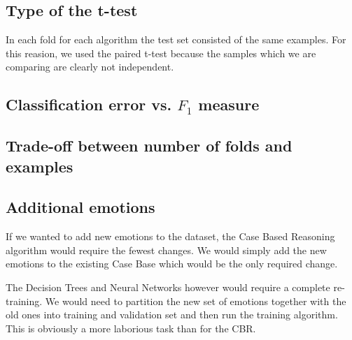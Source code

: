 \documentclass[a4paper]{article}
\begin{document}
\subsection{Type of the t-test}

In each fold for each algorithm the test set consisted of the same examples. For this reasion, we used the paired t-test because the samples which we are comparing are clearly not independent.

\subsection{Classification error vs. $F_1$ measure}



\subsection{Trade-off between number of folds and examples}



\subsection{Additional emotions}

If we wanted to add new emotions to the dataset, the Case Based Reasoning algorithm would require the fewest changes. We would simply add the new emotions to the existing Case Base which would be the only required change. \medskip

The Decision Trees and Neural Networks however would require a complete re-training. We would need to partition the new set of emotions together with the old ones into training and validation set and then run the training algorithm. This is obviously a more laborious task than for the CBR.

\clearpage

\end{document}
